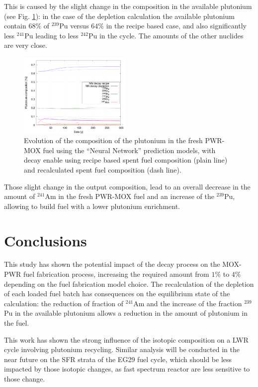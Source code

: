 \documentclass{anstrans}
\begin{document}
This is caused by the slight change in the composition in the available plutonium
(see Fig. \ref{fig:depletioncompo}): in the case of the depletion calculation
the available plutonium contain $68\%$ of $^{239}$Pu versus $64\%$ in the recipe
based case, and also significantly less $^{241}$Pu leading to less $^{242}$Pu in
the cycle. The amounts of the other nuclides are very close.

\begin{figure}[ht] %
  \centering
  \includegraphics[width=0.48\textwidth]{MOX_pu_composition.png}
  \caption{Evolution of the composition of the plutonium in the fresh PWR-MOX fuel
  using the ``Neural Network'' prediction models, with decay enable using recipe
  based spent fuel composition (plain line) and recalculated spent fuel
  composition (dash line).}
  \label{fig:depletioncompo}
\end{figure}

Those slight change in the output composition, lead to an overall decrease in
the amount of $^{241}$Am in the fresh PWR-MOX fuel and an increase of the
$^{239}$Pu, allowing to build fuel with a lower plutonium enrichment.


\section{Conclusions}

This study has shown the potential impact of the decay process on the MOX-PWR fuel
fabrication process, increasing the required amount from $1\%$ to $4\%$
depending on the fuel fabrication model choice. The recalculation of the 
depletion of each loaded fuel batch has consequences on the equilibrium
state of the calculation: the reduction of fraction of $^{241}$Am and the increase of the
fraction $^{239}$Pu in the available plutonium allows a reduction in the amount of
plutonium in the fuel.

This work has shown the strong influence of the isotopic composition on a LWR
cycle involving plutonium recycling. Similar analysis will be conducted in the
near future on the SFR strata of the EG29 fuel cycle, which should be less
impacted by those isotopic changes, as fast spectrum reactor are less sensitive
to those change.
\end{document}
